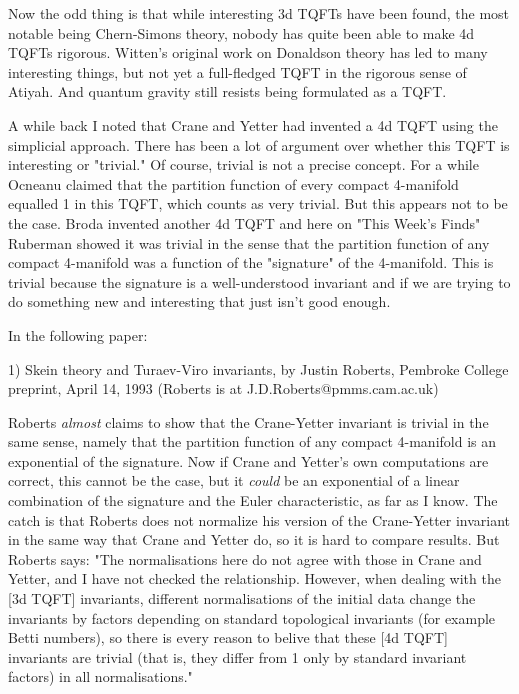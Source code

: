 Now the odd thing is that while interesting 3d TQFTs have been found,
the most notable being Chern-Simons theory, nobody has quite been able
to make 4d TQFTs rigorous.  Witten's original work on Donaldson theory
has led to many interesting things, but not yet a full-fledged TQFT in
the rigorous sense of Atiyah.  And quantum gravity still resists being
formulated as a TQFT.  

A while back I noted that Crane and Yetter had invented a 4d TQFT using
the simplicial approach.  There has been a lot of argument over whether
this TQFT is interesting or "trivial."  Of course, trivial is not a
precise concept.  For a while Ocneanu claimed that the partition
function of every compact 4-manifold equalled 1 in this TQFT, which
counts as very trivial.  But this appears not to be the case.  Broda
invented another 4d TQFT and here on "This Week's Finds" Ruberman showed
it was trivial in the sense that the partition function of any compact
4-manifold was a function of the "signature" of the 4-manifold.  This is
trivial because the signature is a well-understood invariant and if we
are trying to do something new and interesting that just isn't good enough.

In the following paper:

1) Skein theory and Turaev-Viro invariants, by Justin Roberts, Pembroke
College preprint, April 14, 1993 (Roberts is at J.D.Roberts@pmms.cam.ac.uk)

Roberts \emph{almost} claims to show that the Crane-Yetter invariant is
trivial in the same sense, namely that the partition function of any
compact 4-manifold is an exponential of the signature.  Now if Crane and
Yetter's own computations are correct, this cannot be the case, but it
\emph{could} be an exponential of a linear combination of the signature and
the Euler characteristic, as far as I know.  The catch is that Roberts
does not normalize his version of the Crane-Yetter invariant in the same
way that Crane and Yetter do, so it is hard to compare results.  But
Roberts says: "The normalisations here do not agree with those in Crane
and Yetter, and I have not checked the relationship.  However, when
dealing with the [3d TQFT] invariants, different normalisations of the
initial data change the invariants by factors depending on standard
topological invariants (for example Betti numbers), so there is every
reason to belive that these [4d TQFT] invariants are trivial (that is,
they differ from 1 only by standard invariant factors) in all
normalisations."  

